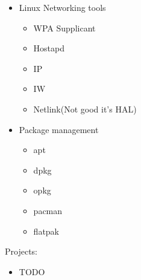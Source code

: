 \begin{itemize}
    \item Linux Networking tools
    \begin{itemize}
        \item WPA Supplicant
        \item Hostapd
        \item IP
        \item IW
        \item Netlink(Not good it's HAL)
    \end{itemize}

    \item Package management
    \begin{itemize}
        \item apt
        \item dpkg
        \item opkg
        \item pacman
        \item flatpak
    \end{itemize}

\end{itemize}

\vintent

Projects:
\begin{itemize}
    \item TODO
\end{itemize}
